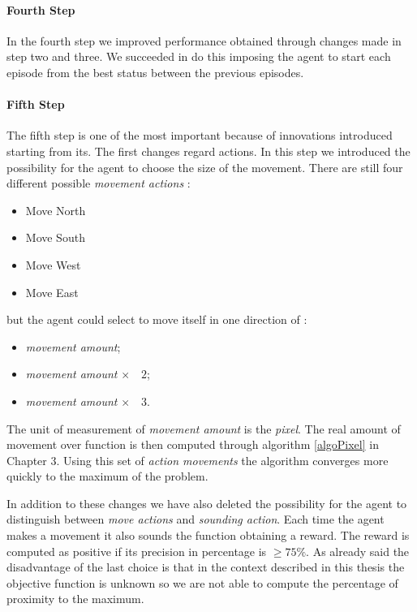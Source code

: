 \paragraph{Fourth Step} In the fourth step we improved performance obtained through changes made in step two and three. We succeeded in do this imposing the agent to start each episode from the best status between the previous episodes. 

\paragraph{Fifth Step} The fifth step is one of the most important because of innovations introduced starting from its. The first changes regard actions. In this step we introduced the possibility for the agent to choose the size of the movement. There are still four different possible \textit{movement actions} :

\begin{itemize}
	\item Move North
	\item Move South
	\item Move West
	\item Move East
\end{itemize}

but the agent could select to move itself in one direction of :

\begin{itemize}
	\item \textit{movement amount};
	\item \textit{movement amount} $\times \quad 2$;
	\item \textit{movement amount} $\times \quad 3$.
\end{itemize}

The unit of measurement of \textit{movement amount} is the \textit{pixel}. The real amount of movement over function is then computed through algorithm \ref{algoPixel} in Chapter $3$. Using this set of \textit{action movements} the algorithm converges more quickly to the maximum of the problem. 

In addition to these changes we have also deleted the possibility for the agent to distinguish between \textit{move actions} and \textit{sounding action}. Each time the agent makes a movement it also sounds the function obtaining a reward. The reward is computed as positive if its precision in percentage is $\ge 75\%$. As already said the disadvantage of the last choice is that in the context described in this thesis the objective function is unknown so we are not able to compute the percentage of proximity to the maximum.

